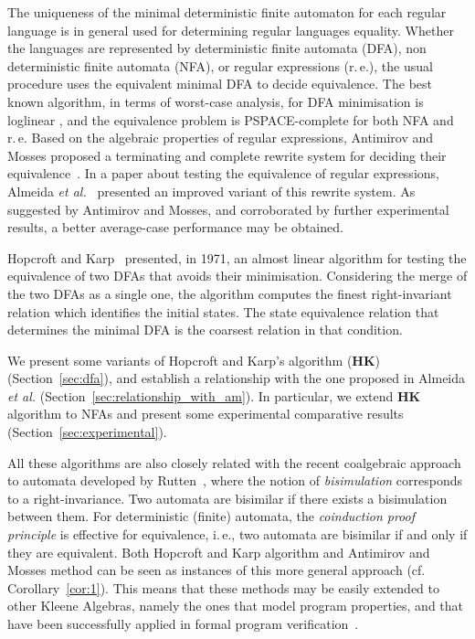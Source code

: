 \documentclass[copyright]{eptcs}
\newcommand{\dfa}{DFA\xspace}
\newcommand{\dfas}{DFAs\xspace}
\newcommand{\nfa}{NFA\xspace}
\newcommand{\re}{r.\,e.\xspace}
\newcommand{\ie}{i.\,e.}
\newcommand{\cf}{cf.\xspace}
\newcommand{\hk}{\textbf{HK}\xspace}
\begin{document}
The uniqueness of the minimal deterministic finite automaton for each
regular language is in general used for determining regular languages
equality. Whether the languages are represented by deterministic
finite automata (\dfa), non deterministic finite automata (\nfa), or
regular expressions (\re), the usual procedure uses the equivalent
minimal \dfa{} to decide equivalence. The best known algorithm, in
terms of worst-case analysis, for \dfa minimisation is loglinear
\cite{hopcroft71_c}, and the equivalence problem is PSPACE-complete
for both \nfa and \re Based on the algebraic properties of regular
expressions, Antimirov and Mosses proposed a terminating and complete
rewrite system for deciding their
equivalence~\cite{antimirov94:_rewrit_exten_regul_expres}. In a paper
about testing the equivalence of regular expressions, Almeida {\em et
  al.}~\cite{almeida08_c:_antim_and_mosses_rewrit_system_revis}
presented an improved variant of this rewrite system.  As suggested by
Antimirov and Mosses, and corroborated by further experimental
results, a better average-case performance may be obtained.

Hopcroft and Karp~\cite{hopcroft71_c:_linear_algor_for_testin_equiv}
presented, in 1971, an almost linear algorithm for testing the
equivalence of two \dfa{}s that avoids their minimisation. Considering
the merge of the two \dfas as a single one, the algorithm computes the
finest right-invariant relation which identifies the initial
states. The state equivalence relation that determines the minimal
\dfa{} is the coarsest relation in that condition.

We present some variants of Hopcroft and Karp's algorithm (\hk{})
(Section~\ref{sec:dfa}), and establish a relationship with the one
proposed in Almeida \emph{et al.}
(Section~\ref{sec:relationship_with_am}).  In particular, we extend
\hk{} algorithm to \nfa{}s and present some experimental comparative
results (Section~\ref{sec:experimental}).

All these algorithms are also closely related with the recent
coalgebraic approach to automata developed by
Rutten~\cite{rutten03:_behav}, where the notion of \emph{bisimulation}
corresponds to a right-invariance. Two automata are bisimilar  if there
exists a bisimulation between them. For deterministic (finite)
automata, the \emph{coinduction proof principle} is effective for
equivalence, \ie, two automata are bisimilar if and only if they are
equivalent. Both Hopcroft and Karp algorithm and Antimirov and Mosses
method can be seen as instances of this more general approach
(\cf Corollary~\ref{cor:1}). This means that these  methods may be
easily extended to other Kleene Algebras,
namely the ones that model program properties, and that have been
successfully applied in formal program verification~\cite{kozen08}.
\end{document}

